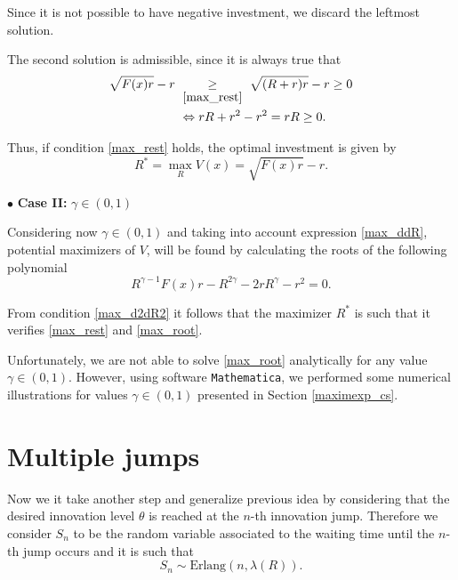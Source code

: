 Since it is not possible to have negative investment, we discard the leftmost solution.

The second solution is admissible, since it is always true that
\begin{align}
 \sqrt{F(x)r}-r  \ &\underset{\eqref{max_rest}}{\geq} \ \sqrt{(R+r)r}-r \geq 0 \nonumber \\
 &\Leftrightarrow rR+r^2-r^2=rR\geq 0.
\end{align}

Thus, if condition \eqref{max_rest} holds, the optimal investment is given by
\begin{equation}
R^*=\max_R V(x)= \sqrt{F(x)r}-r.
\end{equation}


$\bullet$ \textbf{Case II:} $\gamma \in (0,1) $

Considering now $\gamma \in (0,1) $ and taking into account expression \eqref{max_ddR}, potential maximizers of $V$, %
will be found by calculating the roots of the following polynomial
\begin{equation}
R^{\gamma-1}F(x)r-R^{2\gamma}-2rR^\gamma-r^2=0.
 \label{max_root}
\end{equation}


From condition \eqref{max_d2dR2} it follows that the maximizer $R^*$ is such that it verifies \eqref{max_rest} and \eqref{max_root}.

Unfortunately, we are not able to solve \eqref{max_root} analytically for any value $\gamma \in (0,1) $. However, using software \texttt{Mathematica}, we performed some numerical illustrations for values $\gamma \in (0,1)$ presented in Section \ref{maximexp_cs}.


\section{Multiple jumps}
\label{section:max_jumps}

Now we it take another step and generalize previous idea by considering that the desired innovation level $\theta$ is reached at the $n$-th innovation jump.
Therefore we consider $S_n$ to be the random variable associated to the waiting time until the $n$-th jump occurs and it is such that
$$S_n \sim \text{Erlang}(n,\lambda(R)).$$

